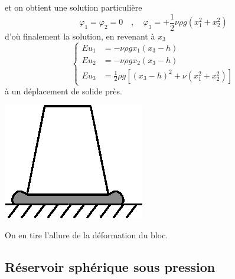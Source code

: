 et on obtient une solution particulière
\begin{equation}
    \varphi_1 = \varphi_2 = 0 \quad,\quad \varphi_3 = + \frac{1}{2}\nu\rho g \left( x_1^2 + x_2^2 \right)
    \label{eq:Ch06-040}
\end{equation}
d'où finalement la solution, en revenant à $x_3$
\begin{equation}
    \left\{
    \begin{aligned}
        E u_1 & = -\nu \rho g x_1 \left( x_3 - h \right) \\
        E u_2 & = -\nu \rho g x_2 \left( x_3 - h \right) \\
        E u_3 & = \frac{1}{2} \rho g \left[ \left( x_3 - h \right)^2 + \nu \left( x_1^2 + x_2^2 \right)  \right]
    \end{aligned}
    \right.
    \label{eq:Ch06-041}
\end{equation}
à un déplacement de solide près.
\begin{multicols}{2}
    \begin{center}
        \includegraphics{../images/T1_Ch06-02}
    \end{center}
    \columnbreak
    On en tire l'allure de la déformation du bloc.
\end{multicols}
\subsection{Réservoir sphérique sous pression}
\endinput
Nous avec et
Î:.= 0 
f 
r=a 
(42) 
l 
r=b 
Compte-tenu de blème, on peut 
On en tire l'allure de la déforma­tion du bloc. 
/ 
SPHERIQUE SOUS PRESSION 
considérerons le réservoir sphérique sous pression du § IV.l les CL cr·· rn.. :0 -1-Ill· ~
<a ~ 
<J'<'i l'O.i :0 0 
la symétrie du pro­
supposer que le 


-91 ­
vecteur déplacement est radial et ne dépend que de la distance au centre r=OM 
(43) -u.. 
4 
= '3 (-") "L'.. 
(44) /i,~ = "L. 'Y:.. 
... 4 
Un calcul direct donne aiors 
(45 ) 
Le gradient du déplacement étant symétrique, il s'ensuit que son rotationnel ..... 
rot.u., est nul. L'équation de Navier \eqref{eq:Ch06-025} donne alors 
(46) 
Compte-tenu de \eqref{eq:Ch06-045}, il vient 
(47) 


